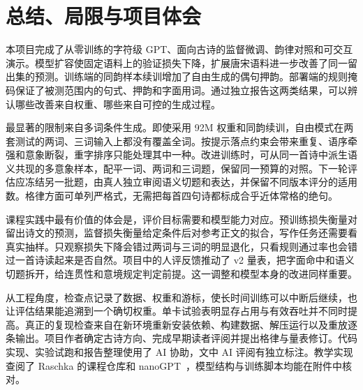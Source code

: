 \section{总结、局限与项目体会}
\label{sec:conclusion}

本项目完成了从零训练的字符级 GPT、面向古诗的监督微调、韵律对照和可交互演示。模型扩容使固定语料上的验证损失下降，扩展唐宋语料进一步改善了同一留出集的预测。训练端的同韵样本续训增加了自由生成的偶句押韵。部署端的规则掩码保证了被测范围内的句式、押韵和字面用词。通过独立报告这两类结果，可以辨认哪些改善来自权重、哪些来自可控的生成过程。

最显著的限制来自多词条件生成。即使采用 92M 权重和同韵续训，自由模式在两套测试的两词、三词输入上都没有覆盖全词。按提示落点约束会带来重复、语序牵强和意象断裂，重字排序只能处理其中一种。改进训练时，可从同一首诗中派生语义共现的多意象样本，配平一词、两词和三词题，保留同一预算的对照。下一轮评估应冻结另一批题，由真人独立审阅语义切题和表达，并保留不同版本评分的适用数。格律方面可单列严格式，无需把每首四句诗都标成合乎近体常格的绝句。

课程实践中最有价值的体会是，评价目标需要和模型能力对应。预训练损失衡量对留出诗文的预测，监督损失衡量给定条件后对参考正文的拟合，写作任务还需要看真实抽样。只观察损失下降会错过两词与三词的明显退化，只看规则通过率也会错过一首诗读起来是否自然。项目中的人评反馈推动了 v2 量表，把字面命中和语义切题拆开，给连贯性和意境规定判定前提。这一调整和模型本身的改进同样重要。

从工程角度，检查点记录了数据、权重和游标，使长时间训练可以中断后继续，也让评估结果能追溯到一个确切权重。单卡试验表明显存占用与有效吞吐并不同时提高。真正的复现检查来自在新环境重新安装依赖、构建数据、解压运行以及重放逐条输出。项目作者确定古诗方向、完成早期读者评阅并提出格律与量表修订。代码实现、实验试跑和报告整理使用了 AI 协助，文中 AI 评阅有独立标注。教学实现查阅了 Raschka 的课程仓库和 nanoGPT~\cite{rasbt,nanogpt}，模型结构与训练脚本均能在附件中核对。
